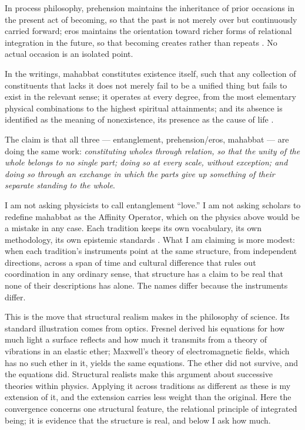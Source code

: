 In process philosophy, prehension maintains the inheritance of prior occasions in the present act of becoming, so that the past is not merely over but continuously carried forward; eros maintains the orientation toward richer forms of relational integration in the future, so that becoming creates rather than repeats \citep{Whitehead1929}. No actual occasion is an isolated point.

In the \bahai writings, mahabbat constitutes existence itself, such that any collection of constituents that lacks it does not merely fail to be a unified thing but fails to exist in the relevant sense; it operates at every degree, from the most elementary physical combinations to the highest spiritual attainments; and its absence is identified as the meaning of nonexistence, its presence as the cause of life \citep[Talks 41, 48, 74]{PUP}.

The claim is that all three — entanglement, prehension/eros, mahabbat — are doing the same work: \emph{constituting wholes through relation, so that the unity of the whole belongs to no single part; doing so at every scale, without exception; and doing so through an exchange in which the parts give up something of their separate standing to the whole}.

I am not asking physicists to call entanglement ``love.'' I am not asking \bahai scholars to redefine mahabbat as the Affinity Operator, which on the physics above would be a mistake in any case. Each tradition keeps its own vocabulary, its own methodology, its own epistemic standards \citep{AdamsThreePaths}. What I am claiming is more modest: when each tradition's instruments point at the same structure, from independent directions, across a span of time and cultural difference that rules out coordination in any ordinary sense, that structure has a claim to be real that none of their descriptions has alone. The names differ because the instruments differ.

This is the move that structural realism makes in the philosophy of science. Its standard illustration comes from optics. Fresnel derived his equations for how much light a surface reflects and how much it transmits from a theory of vibrations in an elastic ether; Maxwell's theory of electromagnetic fields, which has no such ether in it, yields the same equations. The ether did not survive, and the equations did. Structural realists make this argument about successive theories within physics. Applying it across traditions as different as these is my extension of it, and the extension carries less weight than the original. Here the convergence concerns one structural feature, the relational principle of integrated being; it is evidence that the structure is real, and below I ask how much.

